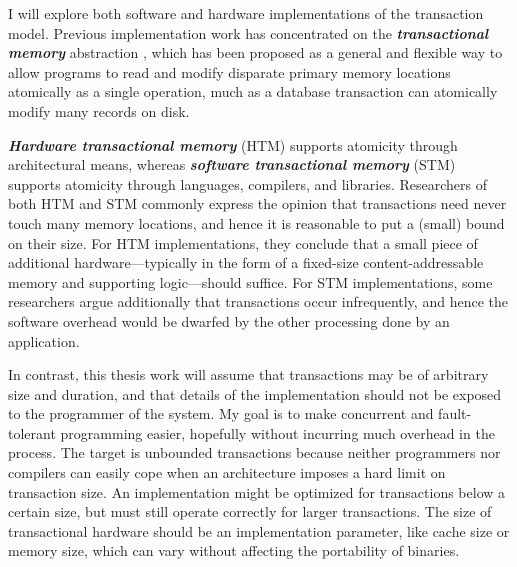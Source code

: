 \documentclass[12pt]{article}
\newcommand{\defn}[1]           {{\textit{\textbf{\boldmath #1}}}}
\begin{document}
I will explore both software and hardware implementations of the
transaction model.
Previous implementation work has concentrated on the
\defn{transactional memory} abstraction
\cite{Knight86,HerlihyMo93,StoneStHe93,RajwarGo02,ShavitTo95,HerlihyLuMoSc03},
which has
been proposed as a general and flexible way to allow programs to read
and modify disparate primary memory locations atomically as a single
operation, much as a database transaction can atomically modify many
records on disk.

\defn{Hardware transactional memory} (HTM) supports atomicity through
architectural means, whereas \defn{software transactional memory}
(STM) supports atomicity through languages, compilers, and libraries.
Researchers of both HTM and STM commonly express the opinion that
transactions need never touch many memory locations, and hence it is
reasonable to put a (small) bound on their size.  For HTM implementations,
they conclude that a small piece of additional hardware---typically in
the form of a fixed-size content-addressable memory and supporting
logic---should suffice.  For STM implementations, some researchers
argue additionally that transactions occur infrequently, and hence the
software overhead would be dwarfed by the other processing done by an
application.

In contrast, this thesis work will assume that transactions may be of
arbitrary size and duration, and that details of the implementation
should not be exposed to the programmer of the system.  My goal is to
make concurrent and fault-tolerant programming easier, hopefully
without incurring much overhead in the process.  The target is
unbounded transactions because neither programmers nor compilers can
easily cope when an architecture imposes a hard limit on transaction
size.  An implementation might be optimized for transactions below a
certain size, but must still operate correctly for larger
transactions.  The size of transactional hardware should be an
implementation parameter, like cache size or memory size, which can
vary without affecting the portability of binaries.
\end{document}
